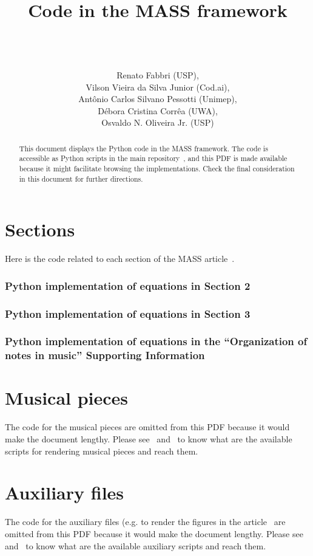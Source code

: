\documentclass{article}
\newcommand{\code}[2]{





 \subsubsection*{#1}
 
}
\begin{document}
\title{Code in the MASS framework}
\author{\\\\\\ Renato Fabbri (USP),\\
Vilson Vieira da Silva Junior (Cod.ai),\\
Ant\^onio Carlos Silvano Pessotti (Unimep),\\
D\'ebora Cristina Corr\^ea (UWA),\\
Osvaldo N. Oliveira Jr. (USP)
}

\maketitle

\begin{abstract}
This document displays the Python code in the MASS
framework.
The code is accessible as Python scripts in the main repository~\cite{massRepo},
and this PDF is made available because it might facilitate
browsing the implementations.
Check the final consideration in this document for further directions.
\end{abstract}

\section{Sections}
Here is the code related to each section of the MASS article~\cite{massArticle}.

% 
\code{Python implementation of equations in Section 2}{../src/sections/2.py}

\clearpage
\code{Python implementation of equations in Section 3}{../src/sections/3.py}

\clearpage
\code{Python implementation of equations in the ``Organization of notes in music'' Supporting Information~\cite{massNotesInMusic}}{../src/sections/SIA.py}

\clearpage
\section{Musical pieces}
The code for the musical pieces are omitted from this PDF because
it would make the document lengthy.
Please see~\cite{massListings} and~\cite{massRepo}
to know what are the available scripts for rendering musical pieces
and reach them.

\section{Auxiliary files}
The code for the auxiliary files (e.g. to render the figures in the article~\cite{massArticle}
are omitted from this PDF because
it would make the document lengthy.
Please see~\cite{massListings} and~\cite{massRepo}
to know what are the available auxiliary scripts
and reach them.
\end{document}

